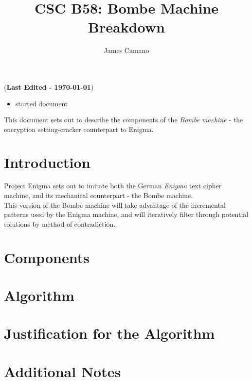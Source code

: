 \documentclass[12pt,a4paper,fleqn]{article}
\author{James Camano}
\title{CSC B58: Bombe Machine Breakdown}
\newcommand{\lastedited}{(\textbf{Last Edited - \today{}})}
\begin{document}
	\maketitle
	\lastedited
	\begin{itemize}
		\item started document
	\end{itemize}		
	
	This document sets out to describe the components of the \emph{Bombe machine} - the encryption setting-cracker counterpart to Enigma.
	
	\section{Introduction}
	Project Enigma sets out to imitate both the German \emph{Enigma} text cipher machine, and its mechanical counterpart - the Bombe machine.  \\
	
	This version of the Bombe machine will take advantage of the incremental patterns used by the Enigma machine, and will iteratively filter through potential solutions by method of contradiction.
	
	\section{Components}
	
	\section{Algorithm}
	
	\section{Justification for the Algorithm}
	
	\section{Additional Notes}	
	
\end{document}
